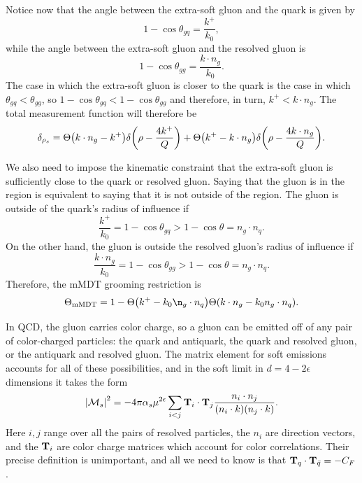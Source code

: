 \documentclass[../thesis.tex]{subfiles}
\providecommand{\mMDT}{\mathrm{mMDT}}
\providecommand{\cM}{\mathcal{M}}
\begin{document}
	Notice now that the angle between the extra-soft gluon and the quark is given by
	\begin{equation}
		1 - \cos\theta_{gq} = \frac{k^+}{k_0},
	\end{equation}
	while the angle between the extra-soft gluon and the resolved gluon is
	\begin{equation}
		1 - \cos\theta_{gg} = \frac{k \cdot n_g}{k_0}.
	\end{equation}
	The case in which the extra-soft gluon is closer to the quark is the case in which $\theta_{gq} < \theta_{gg}$, so $1 - \cos\theta_{gq} < 1 - \cos\theta_{gg}$ and therefore, in turn, $k^+ < k \cdot n_g$. The total measurement function will therefore be
	\begin{equation}
		\delta_{\rho_s} = \Theta\qty(k \cdot n_g - k^+) \delta\qty(\rho - \frac{4 k^+}{Q}) + \Theta\qty(k^+ - k \cdot n_g) \delta\qty(\rho - \frac{4 k \cdot n_g}{Q}).
	\end{equation}

	We also need to impose the kinematic constraint that the extra-soft gluon is sufficiently close to the quark or resolved gluon. Saying that the gluon is in the region is equivalent to saying that it is not outside of the region. The gluon is outside of the quark's radius of influence if
	\begin{equation}
		\frac{k^+}{k_0} = 1 - \cos\theta_{gq} > 1 - \cos\theta = n_g \cdot n_q.
	\end{equation}
	On the other hand, the gluon is outside the resolved gluon's radius of influence if
	\begin{equation}
		\frac{k \cdot n_g}{k_0} = 1- \cos\theta_{gg} > 1 - \cos\theta = n_g \cdot n_q.
	\end{equation}
	Therefore, the mMDT grooming restriction is
	\begin{equation}
		\Theta_\mMDT = 1 - \Theta\qty(k^+ - k_0 \n_g \cdot n_q) \Theta(k\cdot n_g - k_0 n_g \cdot n_q).
	\end{equation}

	In QCD, the gluon carries color charge, so a gluon can be emitted off of any pair of color-charged particles: the quark and antiquark, the quark and resolved gluon, or the antiquark and resolved gluon. The matrix element for soft emissions accounts for all of these possibilities, and in the soft limit in $d = 4 - 2\epsilon$ dimensions it takes the form \cite{catani_infrared_2000}
	\begin{equation}
		\abs{\cM_s}^2 = -4\pi\alpha_s \mu^{2\epsilon} \sum_{i < j} \vb{T}_i \cdot \vb{T}_j \frac{n_i \cdot n_j}{(n_i \cdot k) (n_j \cdot k)}.
	\end{equation}
	Here $i, j$ range over all the pairs of resolved particles, the $n_i$ are direction vectors, and the $\vb{T}_i$ are color charge matrices which account for color correlations. Their precise definition is unimportant, and all we need to know is that $\vb{T}_q \cdot \vb{T}_{\bar q} = -C_F$ \cite{catani_infrared_2000}.
\end{document}
